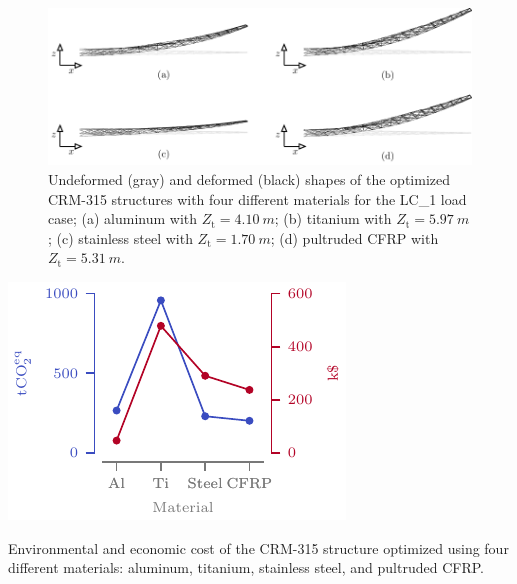 \begin{figure}
    \centering
    \includegraphics[width=\linewidth]{figures/07_aeronautic/00_materials/mat.pdf}
     \caption{Undeformed (gray) and deformed (black) shapes of the optimized CRM-315 structures with four different materials for the LC\_1 load case; (a) aluminum with $Z_\text{t}=\qty{4.10}{m}$; (b) titanium with $Z_\text{t}=\qty{5.97}{m}$; (c) stainless steel with $Z_\text{t}=\qty{1.70}{m}$; (d) pultruded CFRP with $Z_\text{t}=\qty{5.31}{m}$.}
    \label{fig:07_mat_sol}
\end{figure}

\begin{marginfigure}
    \centering
    \includegraphics[width=\linewidth]{figures/07_aeronautic/00_co2eq/co2_dollar.pdf}
    \caption{Environmental and economic cost of the CRM-315 structure optimized using four different materials: aluminum, titanium, stainless steel, and pultruded CFRP.}
    \label{fig:07_cost}
\end{marginfigure}

